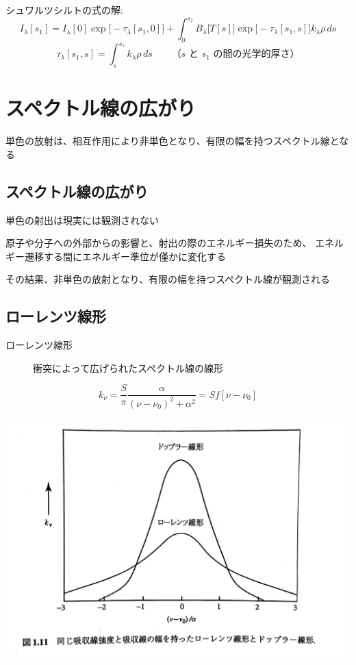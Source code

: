 \documentclass[article]{dennou777}
\newcommand{\centeralign}[1]{\rule{0pt}{0pt}\hfill#1\hfill\rule{0pt}{0pt}}
\begin{document}
シュワルツシルトの式の解:
\begin{equation}
	I_\lambda[s_1]=I_\lambda[0]\exp\bigl[-\tau_\lambda[s_1,0]\bigr]+
	\int^{s_1}_{0}B_\lambda\bigl[T[s]\bigr]\exp\bigl[-\tau_\lambda[s_1,s]\bigr]k_\lambda\rho\,ds
\end{equation}
\begin{equation}
	\tau_\lambda[s_1,s]=\int^{s_1}_s k_\lambda\rho\,ds\qquad\text{（$s$ と $s_1$ の間の光学的厚さ）}
\end{equation}


\section{スペクトル線の広がり}
単色の放射は、相互作用により非単色となり、有限の幅を持つスペクトル線となる

\subsection{スペクトル線の広がり}
単色の射出は現実には観測されない

原子や分子への外部からの影響と、射出の際のエネルギー損失のため、
エネルギー遷移する間にエネルギー準位が僅かに変化する

その結果、非単色の放射となり、有限の幅を持つスペクトル線が観測される

\subsection{ローレンツ線形}
\begin{description}
	\item[ローレンツ線形] 衝突によって広げられたスペクトル線の線形
\end{description}

\begin{equation}
	k_\nu=\frac{S}{\pi}\frac{\alpha}{(\nu-\nu_0)^2+\alpha^2}=Sf[\nu-\nu_0]
\end{equation}
\centeralign{\includegraphics[width=\textwidth]{lorentz.jpg}}
\end{document}
